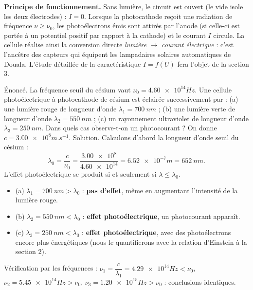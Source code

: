 \documentclass[11pt]{article}
\begin{document}
\textbf{Principe de fonctionnement.} Sans lumière, le circuit est ouvert (le vide isole les deux électrodes) : $I = 0$. Lorsque la photocathode reçoit une radiation de fréquence $\nu \geq \nu_0$, les photoélectrons émis sont attirés par l'anode (si celle-ci est portée à un potentiel positif par rapport à la cathode) et le courant $I$ circule. La cellule réalise ainsi la conversion directe \emph{lumière} $\rightarrow$ \emph{courant électrique} : c'est l'ancêtre des capteurs qui équipent les lampadaires solaires automatiques de Douala. L'étude détaillée de la caractéristique $I = f(U)$ fera l'objet de la section 3.

\begin{exoresolu}
Énoncé. La fréquence seuil du césium vaut $\nu_0 = \num{4,60e14}{Hz}$. Une cellule photoélectrique à photocathode de césium est éclairée successivement par : (a) une lumière rouge de longueur d'onde $\lambda_1 = \SI{700}{nm}$ ; (b) une lumière verte de longueur d'onde $\lambda_2 = \SI{550}{nm}$ ; (c) un rayonnement ultraviolet de longueur d'onde $\lambda_3 = \SI{250}{nm}$. Dans quels cas observe-t-on un photocourant ? On donne $c = \num{3,00e8}{m.s^{-1}}$.
\tcblower
Solution. Calculons d'abord la longueur d'onde seuil du césium :
\[ \lambda_0 = \frac{c}{\nu_0} = \frac{\num{3,00e8}}{\num{4,60e14}} = \num{6,52e-7}{m} = \SI{652}{nm}. \]
L'effet photoélectrique se produit si et seulement si $\lambda \leq \lambda_0$.
\begin{itemize}
\item (a) $\lambda_1 = \SI{700}{nm} > \lambda_0$ : \textbf{pas d'effet}, même en augmentant l'intensité de la lumière rouge.
\item (b) $\lambda_2 = \SI{550}{nm} < \lambda_0$ : \textbf{effet photoélectrique}, un photocourant apparaît.
\item (c) $\lambda_3 = \SI{250}{nm} < \lambda_0$ : \textbf{effet photoélectrique}, avec des photoélectrons encore plus énergétiques (nous le quantifierons avec la relation d'Einstein à la section 2).
\end{itemize}
Vérification par les fréquences : $\nu_1 = \dfrac{c}{\lambda_1} = \num{4,29e14}{Hz} < \nu_0$, $\nu_2 = \num{5,45e14}{Hz} > \nu_0$, $\nu_3 = \num{1,20e15}{Hz} > \nu_0$ : conclusions identiques.
\end{exoresolu}
\end{document}
